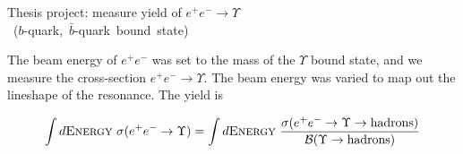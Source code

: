 \begin{slide*}
\slideframe{}
\begin{minipage}[t]{\linewidth}
\Large \black

{\huge Thesis project: measure yield of $e^+ e^- \to \Upsilon$} \\
\mbox{\hspace{4.5cm} ($b$-quark, $\bar{b}$-quark bound state)}

\vspace{1cm}

The beam energy of $e^+ e^-$ was set to the mass of the $\Upsilon$
bound state, and we measure the cross-section $e^+ e^- \to \Upsilon$.
The beam energy was varied to map out the lineshape of the resonance.
The yield is

\vspace{0.5cm}

\[ \int d\mbox{\sc Energy} \ \sigma(e^+ e^- \to \Upsilon) =
   \int d\mbox{\sc Energy} \ \frac{\sigma(e^+ e^- \to \Upsilon \to \mbox{hadrons})}
        {{\mathcal B}(\Upsilon \to \mbox{hadrons})} \]






\vspace{1.5cm}

\begin{center}
\end{center}

\end{minipage}
\end{slide*}

